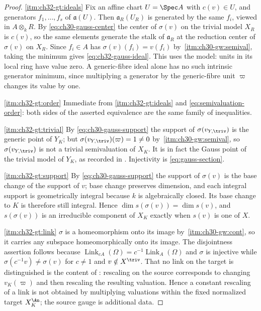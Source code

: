 \begin{proof}
\cref{itm:ch32-gt:ideals}  Fix an affine chart $U=\Spec A$ with
$c(v)\in U$, and generators $f_1,\ldots,f_s$ of $\mathfrak a(U)$.  Then
$\mathfrak a_R(U_R)$ is generated by the same $f_i$, viewed in
$A\otimes_kR$.  By \eqref{eq:ch30-gauss-center} the center of
$\sigma(v)$ on the trivial model $X_R$ is $c(v)$, so the same elements
generate the stalk of $\mathfrak a_R$ at the reduction center of
$\sigma(v)$ on $X_R$.
Since $f_i\in A$ has $\sigma(v)(f_i)=v(f_i)$ by
\,\cref{itm:ch30-gw:semival}, taking the
minimum gives \eqref{eq:ch32-gauss-ideal}.  This uses the model:
units in its local ring have value zero.  A generic-fibre ideal alone
has no such intrinsic generator minimum, since multiplying a generator
by the generic-fibre unit $\varpi$ changes its value by one.

\cref{itm:ch32-gt:order}  Immediate from \cref{itm:ch32-gt:ideals} and
\eqref{eq:semivaluation-order}: both sides of the asserted equivalence are
the same family of inequalities.

\cref{itm:ch32-gt:trivial}  By \eqref{eq:ch30-gauss-support} the support of
$\sigma(v_{Y,\triv})$ is the generic point of $Y_K$; but
$\sigma(v_{Y,\triv})(\varpi)=1\neq0$ by
\,\cref{itm:ch30-gw:semival}, so
$\sigma(v_{Y,\triv})$ is not a trivial semivaluation of $X_K$.  It is in
fact the Gauss point of the trivial model of $Y_K$, as recorded in
.  Injectivity is
\eqref{eq:gauss-section}.

\cref{itm:ch32-gt:support}  By \eqref{eq:ch30-gauss-support} the support of
$\sigma(v)$ is the base change of the support of $v$; base change preserves dimension, and each integral support is
geometrically integral because $k$ is algebraically closed.  Its base
change to $K$ is therefore still integral.  Hence
$\dim s(\sigma(v))=\dim s(v)$, and $s(\sigma(v))$ is an irreducible
component of $X_K$ exactly when $s(v)$ is one of $X$.

\cref{itm:ch32-gt:link}  $\sigma$ is a homeomorphism onto its image by
\,\cref{itm:ch30-gw:cont}, so it carries
any subspace homeomorphically onto its image.  The disjointness assertion
follows because $\operatorname{Link}_{cA}(\Omega)
=c^{-1}\operatorname{Link}_A(\Omega)$ and $\sigma$ is injective while
$\sigma(c^{-1}v)\neq\sigma(v)$ for $c\neq1$ and
$v\notin X^{\triv}$.  That no link on the target is distinguished is the
content of : rescaling on the source
corresponds to changing $v_K(\varpi)$ and then rescaling the resulting
valuation.  Hence a constant rescaling of a link is not obtained by
multiplying valuations within the fixed normalized target $X_K^{\An}$; the source gauge is
additional data.


\end{proof}
